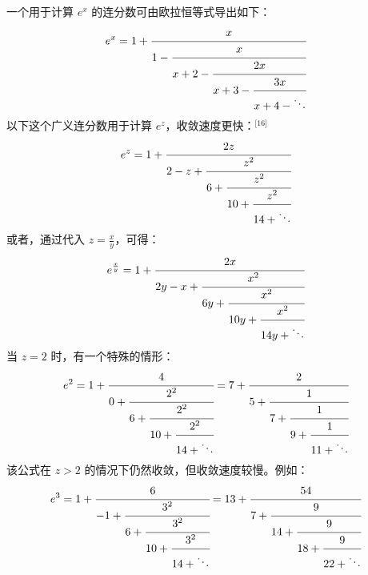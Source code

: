 一个用于计算 $e^x$ 的连分数可由欧拉恒等式导出如下：
$$
e^x = 1 + \cfrac{x}{1 - \cfrac{x}{x + 2 - \cfrac{2x}{x + 3 - \cfrac{3x}{x + 4 - \ddots}}}}~
$$
以下这个广义连分数用于计算 $e^z$，收敛速度更快：\(^\text{[16]}\)
$$
e^{z} = 1 + \cfrac{2z}{2 - z + \cfrac{z^2}{6 + \cfrac{z^2}{10 + \cfrac{z^2}{14 + \ddots}}}}~
$$
或者，通过代入 $z = \frac{x}{y}$，可得：
$$
e^{\frac{x}{y}} = 1 + \cfrac{2x}{2y - x + \cfrac{x^2}{6y + \cfrac{x^2}{10y + \cfrac{x^2}{14y + \ddots}}}}~
$$
当 $z = 2$ 时，有一个特殊的情形：
$$
e^2 = 1 + \cfrac{4}{0 + \cfrac{2^2}{6 + \cfrac{2^2}{10 + \cfrac{2^2}{14 + \ddots}}}} = 7 + \cfrac{2}{5 + \cfrac{1}{7 + \cfrac{1}{9 + \cfrac{1}{11 + \ddots}}}}~
$$
该公式在 $z > 2$ 的情况下仍然收敛，但收敛速度较慢。例如：
$$
e^3 = 1 + \cfrac{6}{-1 + \cfrac{3^2}{6 + \cfrac{3^2}{10 + \cfrac{3^2}{14 + \ddots}}}} = 13 + \cfrac{54}{7 + \cfrac{9}{14 + \cfrac{9}{18 + \cfrac{9}{22 + \ddots}}}}~
$$
